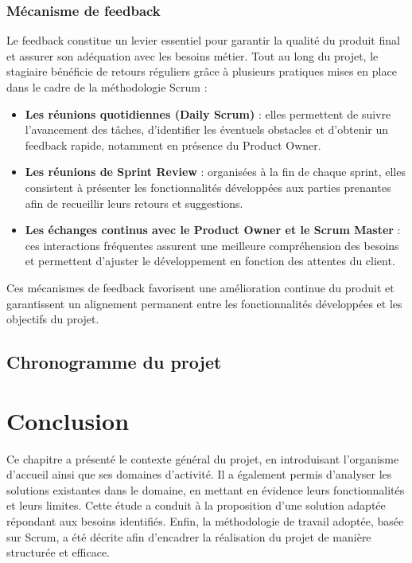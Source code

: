 \subsubsection{Mécanisme de feedback}

Le feedback constitue un levier essentiel pour garantir la qualité du produit final et assurer son adéquation avec les besoins métier. Tout au long du projet, le stagiaire bénéficie de retours réguliers grâce à plusieurs pratiques mises en place dans le cadre de la méthodologie Scrum :\\

\begin{itemize}
    \item \textbf{Les réunions quotidiennes (Daily Scrum)} : elles permettent de suivre l’avancement des tâches, d’identifier les éventuels obstacles et d’obtenir un feedback rapide, notamment en présence du Product Owner.\\
    
    \item \textbf{Les réunions de Sprint Review} : organisées à la fin de chaque sprint, elles consistent à présenter les fonctionnalités développées aux parties prenantes afin de recueillir leurs retours et suggestions.\\
    
    \item \textbf{Les échanges continus avec le Product Owner et le Scrum Master} : ces interactions fréquentes assurent une meilleure compréhension des besoins et permettent d’ajuster le développement en fonction des attentes du client.
\end{itemize}

Ces mécanismes de feedback favorisent une amélioration continue du produit et garantissent un alignement permanent entre les fonctionnalités développées et les objectifs du projet.



\subsection{Chronogramme du projet}


\section{Conclusion}
Ce chapitre a présenté le contexte général du projet, en introduisant l’organisme d’accueil ainsi que ses domaines d’activité. Il a également permis d’analyser les solutions existantes dans le domaine, en mettant en évidence leurs fonctionnalités et leurs limites. Cette étude a conduit à la proposition d’une solution adaptée répondant aux besoins identifiés. Enfin, la méthodologie de travail adoptée, basée sur Scrum, a été décrite afin d’encadrer la réalisation du projet de manière structurée et efficace.

